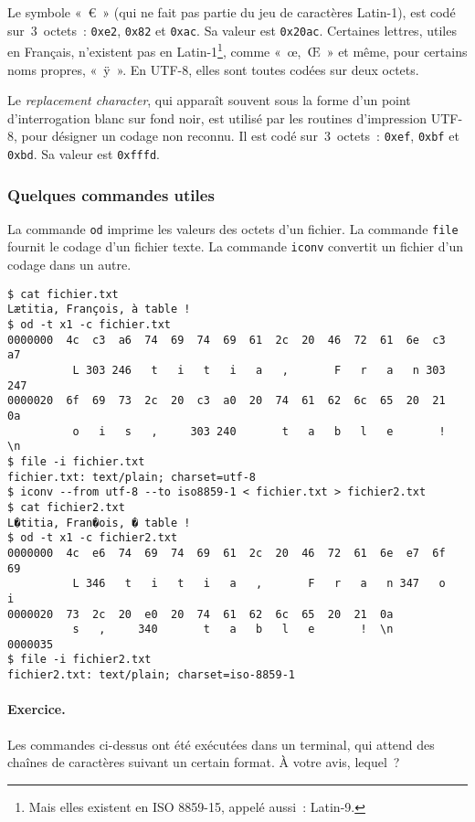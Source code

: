 \documentclass[12pt]{article}
\newcounter{points_counter}
\newcounter{section_points_counter}
\begin{document}
Le symbole «~€~» (qui ne fait pas partie du jeu de caractères Latin-1),
est codé sur~$3$~octets~: {\tt 0xe2}, {\tt 0x82} et {\tt 0xac}. Sa
valeur est {\tt 0x20ac}. Certaines lettres, utiles en Français, n'existent
pas en Latin-1\footnote{Mais elles existent en ISO 8859-15, appelé
aussi~: Latin-9.}, comme «~œ,~Œ~» et même, pour certains noms 
propres, «~ÿ~». En UTF-8, elles sont toutes codées sur deux octets.

Le {\em replacement character}, qui apparaît souvent sous la forme
d'un point d'interrogation blanc sur fond noir, est utilisé par
les routines d'impression UTF-8, pour désigner un codage non reconnu.
Il est codé sur~$3$~octets~: {\tt 0xef}, {\tt 0xbf} et {\tt 0xbd}.
Sa valeur est {\tt 0xfffd}.

\subsubsection*{Quelques commandes utiles}

La commande {\tt od} imprime les valeurs des octets d'un fichier.
La commande {\tt file} fournit le codage d'un fichier texte.
La commande {\tt iconv} convertit un fichier d'un codage dans un autre.

\begin{verbatim}
$ cat fichier.txt 
Lætitia, François, à table !
$ od -t x1 -c fichier.txt 
0000000  4c  c3  a6  74  69  74  69  61  2c  20  46  72  61  6e  c3  a7
          L 303 246   t   i   t   i   a   ,       F   r   a   n 303 247
0000020  6f  69  73  2c  20  c3  a0  20  74  61  62  6c  65  20  21  0a
          o   i   s   ,     303 240       t   a   b   l   e       !  \n
$ file -i fichier.txt
fichier.txt: text/plain; charset=utf-8
$ iconv --from utf-8 --to iso8859-1 < fichier.txt > fichier2.txt
$ cat fichier2.txt 
L�titia, Fran�ois, � table !
$ od -t x1 -c fichier2.txt 
0000000  4c  e6  74  69  74  69  61  2c  20  46  72  61  6e  e7  6f  69
          L 346   t   i   t   i   a   ,       F   r   a   n 347   o   i
0000020  73  2c  20  e0  20  74  61  62  6c  65  20  21  0a
          s   ,     340       t   a   b   l   e       !  \n
0000035
$ file -i fichier2.txt
fichier2.txt: text/plain; charset=iso-8859-1
\end{verbatim}

\paragraph{Exercice.} Les commandes ci-dessus ont été exécutées dans
un terminal, qui attend des chaînes de caractères suivant un certain
format. À votre avis, lequel~?
\end{document}
